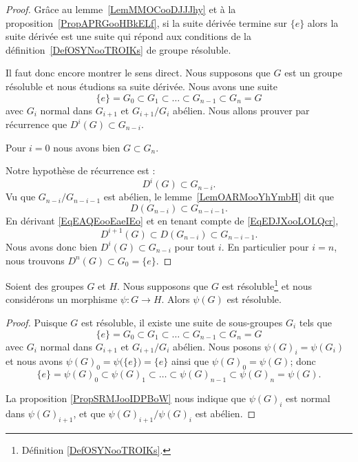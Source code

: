 \begin{proof}
	Grâce au lemme~\ref{LemMMOCooDJJJhy} et à la proposition~\ref{PropAPRGooHBkELf}, si la suite dérivée termine sur \( \{ e \}\) alors la suite dérivée est une suite qui répond aux conditions de la définition~\ref{DefOSYNooTROIKs} de groupe résoluble.

	Il faut donc encore montrer le sens direct. Nous supposons que \( G\) est un groupe résoluble et nous étudions sa suite dérivée. Nous avons une suite
	\begin{equation}
		\{ e \}=G_0\subset G_1\subset\ldots\subset G_{n-1}\subset G_n=G
	\end{equation}
	avec \( G_{i}\) normal dans \( G_{i+1}\) et \( G_{i+1}/G_i\) abélien. Nous allons prouver par récurrence que \( D^i(G)\subset G_{n-i}\).

	Pour \( i=0\) nous avons bien \( G\subset G_n\).

	Notre hypothèse de récurrence est :
	\begin{equation}    \label{EqEAQEooEaeIEo}
		D^i(G)\subset G_{n-i}.
	\end{equation}
	Vu que \( G_{n-i}/G_{n-i-1}\) est abélien, le lemme~\ref{LemOARMooYhYmbH} dit que
	\begin{equation}    \label{EqEDJXooLOLQcr}
		D(G_{n-i})\subset G_{n-i-1}.
	\end{equation}
	En dérivant \eqref{EqEAQEooEaeIEo} et en tenant compte de \eqref{EqEDJXooLOLQcr},
	\begin{equation}
		D^{i+1}(G)\subset D(G_{n-i})\subset G_{n-i-1}.
	\end{equation}
	Nous avons donc bien \( D^i(G)\subset G_{n-i}\) pour tout \( i\). En particulier pour \( i=n\), nous trouvons \( D^n(G)\subset G_0=\{ e \}\).
\end{proof}

\begin{proposition} \label{PropBNEZooJMDFIB}
	Soient des groupes \( G\) et \( H\). Nous supposons que \( G\) est résoluble\footnote{Définition \ref{DefOSYNooTROIKs}.} et nous considérons un morphisme \( \psi\colon G\to H\). Alors \( \psi(G)\) est résoluble.
\end{proposition}

\begin{proof}
	Puisque \( G\) est résoluble, il existe une suite de sous-groupes \( G_i\) tels que
	\begin{equation}
		\{ e \}=G_0\subset G_1\subset\ldots\subset G_{n-1}\subset G_n=G
	\end{equation}
	avec \( G_{i}\) normal dans \( G_{i+1}\) et \( G_{i+1}/G_i\) abélien. Nous posons \( \psi(G)_i=\psi(G_i)\) et nous avons \( \psi(G)_0=\psi\big( \{ e \} \big)=\{ e \}\) ainsi que \( \psi(G)_0=\psi(G)\); donc
	\begin{equation}
		\{ e \}=\psi(G)_0\subset \psi(G)_{1}\subset\ldots\subset \psi(G)_{n-1}\subset \psi(G)_n=\psi(G).
	\end{equation}

	La proposition \ref{PropSRMJooIDPBoW} nous indique que \( \psi(G)_i\) est normal dans \( \psi(G)_{i+1}\), et que \( \psi(G)_{i+1}/\psi(G)_{i}\) est abélien.
\end{proof}

